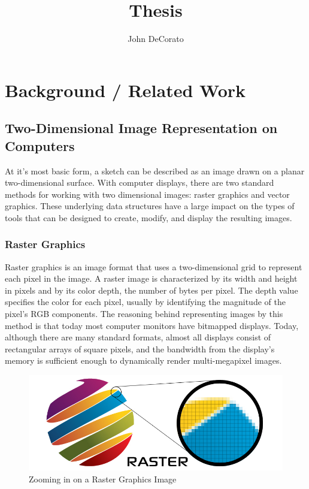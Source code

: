 \documentclass[11pt]{report}
\title{Thesis}
\author{John DeCorato}
\date{ }
\begin{document}
\chapter{Background / Related Work}

\section{Two-Dimensional Image Representation on Computers}

At it's most basic form, a sketch can be described as an image drawn on a planar two-dimensional surface.
With computer displays, there are two standard methods for working with two dimensional images: raster graphics and vector graphics.
These underlying data structures have a large impact on the types of tools that can be designed to create, modify, and display the resulting images.

\subsection{Raster Graphics}

Raster graphics is an image format that uses a two-dimensional grid to represent each pixel in the image. 
A raster image is characterized by its width and height in pixels and by its color depth, the number of bytes per pixel. 
The depth value specifies the color for each pixel, usually by identifying the magnitude of the pixel's RGB components. 
The reasoning behind representing images by this method is that today most computer monitors have bitmapped displays. 
Today, although there are many standard formats, almost all displays consist of rectangular arrays of square pixels, and the bandwidth from the display's memory is sufficient enough to dynamically render multi-megapixel images. 
\begin{figure}
\includegraphics[width=\textwidth]{raster.jpg}
\caption{Zooming in on a Raster Graphics Image}
\end{figure}
\end{document}
